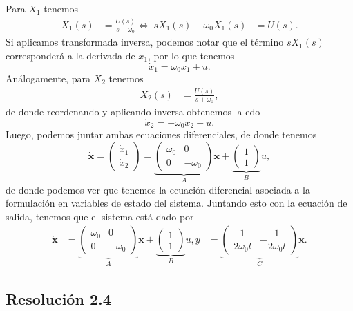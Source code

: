 \documentclass[
  11pt,
  letterpaper,
   addpoints,
  answers
  ]{exam}
\begin{document}
\begin{questions}
\begin{solution}
Para $X_1$ tenemos
\begin{align}
X_1(s)&=\frac{U(s)}{s-\omega_0}
\Leftrightarrow\; sX_1(s)-\omega_0 X_1(s)&=U(s).
\end{align}
Si aplicamos transformada inversa, podemos notar que el término $sX_1(s)$ corresponderá a la derivada de $x_1$, por lo que tenemos
\begin{equation}
\dot{x}_1=\omega_0 x_1+u.
\end{equation}
Análogamente, para $X_2$ tenemos
\begin{align}
X_2(s)&=\frac{U(s)}{s+\omega_0},
\end{align}
de donde reordenando y aplicando inversa obtenemos la edo
\begin{equation}
\dot{x}_2=-\omega_0 x_2+u.
\end{equation}
Luego, podemos juntar ambas ecuaciones diferenciales, de donde tenemos
\begin{equation}
\dot{\mathbf{x}}=
\begin{pmatrix}
\dot{x}_1\\[2pt]
\dot{x}_2
\end{pmatrix}
=
\underbrace{\begin{pmatrix}\omega_0 & 0\\[2pt] 0 & -\omega_0\end{pmatrix}}_{A}\mathbf{x}
+\underbrace{\begin{pmatrix}1\\[2pt]1\end{pmatrix}}_{B}u,
\end{equation}
de donde podemos ver que tenemos la ecuación diferencial asociada a la formulación en variables de estado del sistema. Juntando esto con la ecuación de salida, tenemos que el sistema está dado por
\begin{align}
\dot{\mathbf{x}}&=
\underbrace{\begin{pmatrix}\omega_0&0\\[2pt]0&-\omega_0\end{pmatrix}}_{A}\mathbf{x}
+\underbrace{\begin{pmatrix}1\\[2pt]1\end{pmatrix}}_{B}u,
y&=\underbrace{\begin{pmatrix}\dfrac{1}{2\omega_0 l}&-\dfrac{1}{2\omega_0 l}\end{pmatrix}}_{C}\mathbf{x}.
\end{align}

\subsection*{Resolución 2.4}


\end{solution}
\end{questions}
\end{document}
